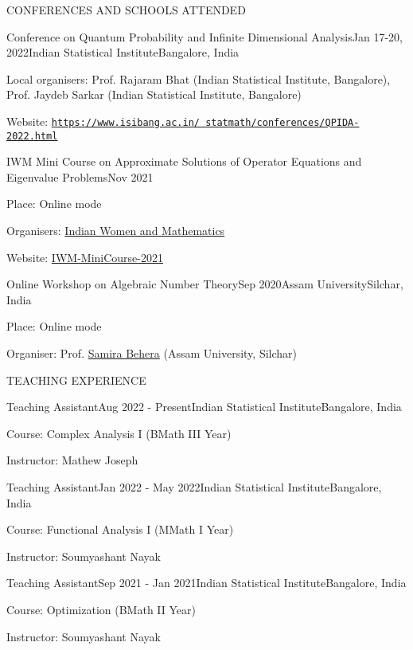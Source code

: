 \documentclass{resume} %
\newcommand{\weblink}[1]{\texttt{\href{#1}{#1}}}
\begin{document}
\begin{rSection}{CONFERENCES AND SCHOOLS ATTENDED}
	\begin{rSubsection}{Conference on Quantum Probability and Infinite Dimensional Analysis}{Jan 17-20, 2022}{Indian Statistical Institute}{Bangalore, India}
		\item Local organisers: Prof. Rajaram Bhat (Indian Statistical Institute, Bangalore), Prof. Jaydeb Sarkar (Indian Statistical Institute, Bangalore)
		
		\item Website: \weblink{https://www.isibang.ac.in/~statmath/conferences/QPIDA-2022.html}
	\end{rSubsection}

	\begin{rSubsection}{IWM Mini Course on Approximate Solutions of Operator Equations and Eigenvalue Problems}{Nov 2021}{}{}
		\item Place: Online mode
		\item Organisers: \href{https://sites.google.com/site/iwmmath/}{Indian Women and Mathematics}
		
		\item Website: \href{https://drive.google.com/file/d/1FYd-6j_hwOMfc2Z9NIQiv2ZqSnF859J4/view}{IWM-MiniCourse-2021}
	\end{rSubsection}

	\begin{rSubsection}{Online Workshop on Algebraic Number Theory}{Sep 2020}{Assam University}{Silchar, India}
		\item Place: Online mode
		\item Organiser: Prof. \href{sbsap.aus@gmail.com}{Samira Behera} (Assam University, Silchar)
	\end{rSubsection}

	
\end{rSection}

\begin{rSection}{TEACHING EXPERIENCE}
	
	\begin{rSubsection}{Teaching Assistant}{Aug 2022 - Present}{Indian Statistical Institute}{Bangalore, India}
		\item Course: Complex Analysis I (BMath III Year)
		\item Instructor: Mathew Joseph
	\end{rSubsection}

	\begin{rSubsection}{Teaching Assistant}{Jan 2022 - May 2022}{Indian Statistical Institute}{Bangalore, India}
		\item Course: Functional Analysis I (MMath I Year)
		\item Instructor: Soumyashant Nayak
	\end{rSubsection}
	
	\begin{rSubsection}{Teaching Assistant}{Sep 2021 - Jan 2021}{Indian Statistical Institute}{Bangalore, India}
		\item Course: Optimization (BMath II Year)
		\item Instructor: Soumyashant Nayak
	\end{rSubsection}

\end{rSection}
\end{document}
